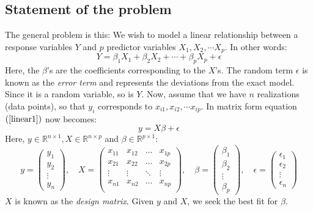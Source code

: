 \documentclass[12pt, a4paper]{article}
\begin{document}
\subsection{Statement of the problem}
The general problem is this: We wish to model a linear relationship between a response variables $Y$ and $p$ predictor variables $X_1, X_2,\cdots X_p$. In other words:
\begin{equation}
\label{linear1}
Y=\beta_1 X_1 + \beta_2 X_2 + \cdots + \beta_p X_p+\epsilon
\end{equation}
Here, the $\beta$'s are the coefficients corresponding to the $X$'s. The random term $\epsilon$ is known as the \textit{error term} and represents the deviations from the exact model. Since it is a random variable, so is $Y$. Now, assume that we have $n$ realizations (data points), so that $y_i$ corresponds to $x_{i1}, x_{i2},\cdots x_{ip}$. In matrix form equation $(\ref{linear1})$ now becomes: 
\begin{equation}
\label{linear2}
y=X\beta+\epsilon
\end{equation}
Here, $y\in\mathbb{R}^{n\times 1}, X\in\mathbb{R}^{n\times p}$ and $\beta\in\mathbb{R}^{p\times 1}$:
\begin{equation}
y = 
\begin{pmatrix}
	y_1 \\ y_2 \\ \vdots \\ y_n
\end{pmatrix},\quad
X =
\begin{pmatrix}
	x_{11} 	& x_{12} 	& \ldots	& x_{1p} \\
	x_{21} 	& x_{22} 	& \ldots	& x_{2p} \\
	\vdots	& \vdots	& \ddots	& \vdots \\
	x_{n1} 	& x_{n2} 	& \ldots	& x_{np} \\
\end{pmatrix},\quad
\beta =
\begin{pmatrix}
	\beta_1	\\ \beta_2	\\ \vdots\\	\beta_p 
\end{pmatrix},\quad
\epsilon = 
\begin{pmatrix}
	\epsilon_1 \\ \epsilon_2 \\ \vdots \\ \epsilon_n
\end{pmatrix}
\end{equation}
$X$ is known as the \textit{design matrix}. Given $y$ and $X$, we seek the best fit for $\beta$.
\end{document}
